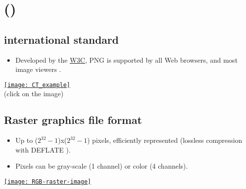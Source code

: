 \chapter{ ()}

\section{ international standard}
\begin{itemize}
\item Developed by the \href{https://www.w3.org/}{W3C}, \gls{PNG}
  \cite{roelofs1999png} is supported by all Web browsers, and most
  image viewers \cite{wikipedia_PNG}.
\end{itemize}
\begin{center}
  \href{https://upload.wikimedia.org/wikipedia/commons/0/05/CT_of_a_normal_abdomen_and_pelvis%2C_coronal_plane_79.png}{\texttt{[image: CT\_example]}}\\
     (click on the image)
\end{center}

\section{Raster graphics file format}
\begin{itemize}
\item Up to ($2^{32}-1$)x($2^{32}-1$) pixels, efficiently represented
  (lossless compression with DEFLATE \cite{deutsch1996deflate}).
\item Pixels can be gray-scale (1 channel) or color
   (4 channels).
\end{itemize}
\vspace{-3ex}
\begin{center}
  \href{https://en.wikipedia.org/wiki/Raster_graphics}{\texttt{[image: RGB-raster-image]}}
\end{center}

